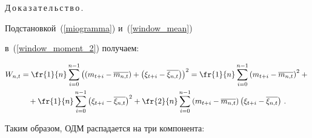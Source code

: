     \smallskip





\noindent


Д\,о\,к\,а\,з\,а\,т\,е\,л\,ь\,с\,т\,в\,о\,.\ \


Подстановкой~(\ref{miogramma}) и~(\ref{window_mean})


в~(\ref{window_moment_2}) получаем:


  \begin{multline}


        \label{window_moment_2_v1}


                W_{n,t} = \fr{1}{n}\sum\limits^{n-1}_{i=0}\left(\left(m_{t+i} -


                \overline{m_{n,t}}\right) + \left(\xi_{t+i} -


                \overline{\xi_{n,t}}\right)\right)^2  = \fr{1}{n}\sum\limits^{n-1}_{i=0}\left(m_{t+i} -


                \overline{m_{n,t}}\right)^2 +{}\\


                {}+ \fr{1}{n}\sum\limits^{n-1}_{i=0}


                \left(\xi_{t+i} - \overline{\xi_{n,t}}\right)^2 + \fr{2}{n}\sum\limits^{n-1}_{i=0}\left(m_{t+i} -


                \overline{m_{n,t}}\right)\left(\xi_{t+i} -


                \overline{\xi_{n,t}}\right)\,.


\end{multline}





    Таким образом, ОДМ распадается на три компонента:


